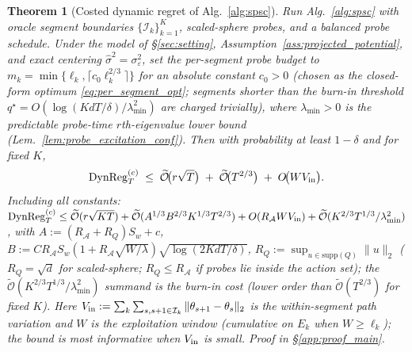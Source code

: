 \documentclass{article}
\newcommand{\cA}{\mathcal{A}}
\newcommand{\cI}{\mathcal{I}}
\newcommand{\tilO}{\widetilde{\mathcal{O}}}
\newcommand{\DynReg}{\mathrm{DynReg}}
\newtheorem{theorem}{Theorem}[section]
\begin{document}
\begin{theorem}[Costed dynamic regret of Alg.~\ref{alg:spsc}]
\label{thm:spsc_regret}
Run Alg.~\ref{alg:spsc} with oracle segment boundaries
$\{\cI_k\}_{k=1}^K$, scaled-sphere probes, and a balanced probe
schedule. Under the model of \S\ref{sec:setting},
Assumption~\ref{ass:projected_potential}, and exact centering
$\widehat\sigma^2=\sigma_\varepsilon^2$, set the per-segment probe
budget to $m_k=\min\{\ell_k,\lceil c_0\ell_k^{2/3}\rceil\}$ for an
absolute constant $c_0>0$ (chosen as the closed-form optimum
\eqref{eq:per_segment_opt}; segments shorter than the burn-in
threshold $q^\star=O(\log(KdT/\delta)/\lambda_{\min}^2)$ are charged
trivially), where $\lambda_{\min}>0$ is the predictable probe-time
$r$th-eigenvalue lower bound (Lem.~\ref{lem:probe_excitation_conf}).
Then with probability at least $1-\delta$ and for fixed $K$,
\begin{equation}
\DynReg_T^{(c)} \;\le\; \tilO\!\bigl(r\sqrt{T}\bigr) \;+\; \tilO\!\bigl(T^{2/3}\bigr) \;+\; O\!\bigl(W V_{\rm in}\bigr).
\label{eq:main_bound}
\end{equation}
Including all constants:
$\DynReg_T^{(c)} \le \tilO(r\sqrt{KT}) + \tilO(A^{1/3}B^{2/3}K^{1/3}T^{2/3}) + O(R_\cA W V_{\rm in}) + \tilO(K^{2/3}T^{1/3}/\lambda_{\min}^2)$,
with $A:=(R_\cA+R_Q)S_w+c$,
$B:=C R_\cA S_w(1+R_\cA\sqrt{W/\lambda})\sqrt{\log(2KdT/\delta)}$,
$R_Q:=\sup_{u\in\mathrm{supp}(Q)}\|u\|_2$ ($R_Q=\sqrt d$ for
scaled-sphere; $R_Q\le R_\cA$ if probes lie inside the action set);
the $\tilO(K^{2/3}T^{1/3}/\lambda_{\min}^2)$ summand is the burn-in
cost (lower order than $\tilO(T^{2/3})$ for fixed $K$). Here
$V_{\rm in}:=\sum_k\sum_{s,s+1\in\cI_k}\|\theta_{s+1}-\theta_s\|_2$
is the within-segment path variation and $W$ is the exploitation
window (cumulative on $E_k$ when $W\ge\ell_k$); the bound is most
informative when $V_{\rm in}$ is small. Proof in
\S\ref{app:proof_main}.
\end{theorem}
\end{document}
